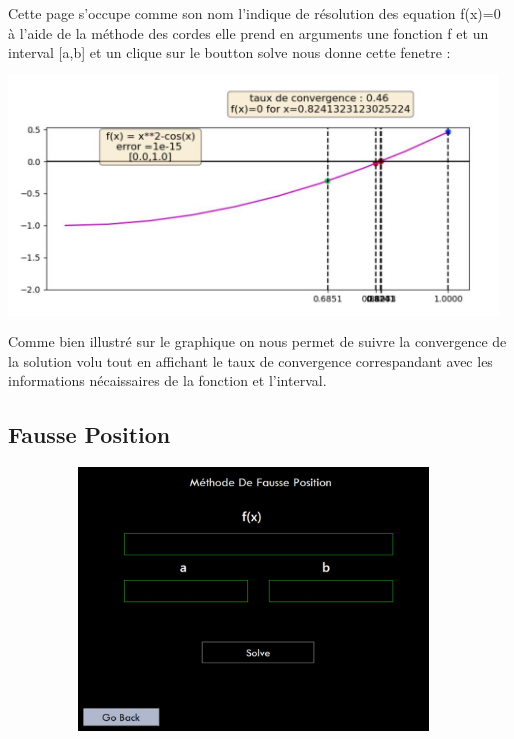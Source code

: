 \documentclass{article}
\begin{document}
Cette page s'occupe comme son nom l'indique de résolution des equation f(x)=0 à l'aide de la méthode des cordes elle prend en arguments une fonction f et un interval [a,b] et un clique sur le boutton solve nous donne cette fenetre :\\ 
\includegraphics[width=13cm,height=7cm]{img/cordes_graph.JPG}\\

Comme bien illustré sur le graphique on nous permet de suivre la convergence de la solution volu tout en affichant le taux de convergence correspandant avec les informations nécaissaires de la fonction et l'interval.\\
\subsection{Fausse Position}
\includegraphics[width=13cm,height=7cm]{img/fausse_pos.JPG}\\
\end{document}
